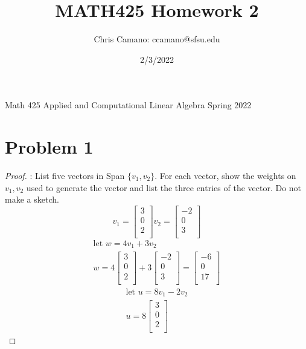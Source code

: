 \documentclass[12pt,a4paper]{article}
\author{Chris Camano: ccamano@sfsu.edu}
\title{MATH425 Homework  2 }
\date{2/3/2022}
\begin{document}
\maketitle
\noindent
Math 425 \qquad
Applied and Computational Linear Algebra \qquad
Spring 2022
\vskip 5pt
\noindent
\section*{Problem 1}
\begin{proof}
  : List five vectors in Span $\{v_1, v_2\}$. For each vector, show the weights on $v_1, v_2$ used to
  generate the vector and list the three entries of the vector. Do not make a sketch.
  \[
    v_1=\begin{bmatrix}
      3\\
      0\\
      2\\
  \end{bmatrix}
  v_2=\begin{bmatrix}
    -2\\
    0\\
    3\\
  \end{bmatrix}
  \]
  \begin{align*}
    \text{let } w=4v_1+3v_2\\
    w=  4\begin{bmatrix}
        3\\
        0\\
        2\\
    \end{bmatrix}
    +3\begin{bmatrix}
      -2\\
      0\\
      3\\
    \end{bmatrix}
    =\begin{bmatrix}
      -6\\
      0\\
      17\\
    \end{bmatrix}
  \end{align*}
  \begin{align*}
    \text{let } u=8v_1-2v_2\\
    u=  8\begin{bmatrix}
        3\\
        0\\
        2\\
    \end{bmatrix}

\end{align*}
\end{proof}
\end{document}
